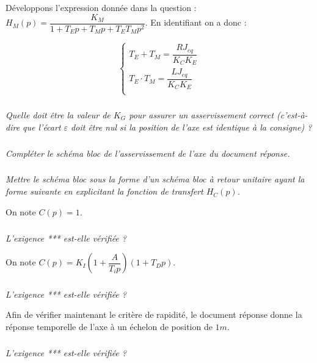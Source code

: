 \documentclass[10pt,fleqn]{article} %
\begin{document}
\begin{multicols}{2}
\begin{corrige}
Développons l'expression donnée dans la question : 
$H_M(p)=\dfrac{K_M}{1+T_Ep + T_M p + T_E T_M p^2}$. En identifiant on a donc :

$$
\left\{ 
\begin{array}{l}
T_E + T_M = \dfrac{RJ_{eq}}{K_C K_E} \\
T_E \cdot T_M = \dfrac{LJ_{eq}}{K_C K_E} \\
\end{array}
\right.
$$


\end{corrige}
\else
\fi
\subparagraph{}
\textit{Quelle doit être la valeur de $K_G$ pour assurer un asservissement correct (c'est-à-dire que l'écart $\varepsilon$ doit être nul si la position de l'axe est identique à la consigne) ?}
\ifprof
\begin{corrige}
\end{corrige}
\else
\fi
\subparagraph{}
\textit{Compléter le schéma bloc de l'asservissement de l'axe du document réponse.}
\ifprof
\begin{corrige}
\end{corrige}
\else
\fi

\subparagraph{}
\textit{Mettre le schéma bloc sous la forme d'un schéma bloc à retour unitaire ayant la forme suivante en explicitant la fonction de transfert $H_C(p)$.}
\ifprof
\begin{corrige}
\end{corrige}
\else
\fi

On note $C(p)=1$.
\subparagraph{}
\textit{L'exigence *** est-elle vérifiée ?}
\ifprof
\begin{corrige}
\end{corrige}
\else
\fi

On note $C(p)=K_I \left( 1+\dfrac{A}{T_i p} \right) \left(1+ T_D p \right)$.
\subparagraph{}
\textit{L'exigence *** est-elle vérifiée ?}
\ifprof
\begin{corrige}
\end{corrige}
\else
\fi

Afin de vérifier maintenant le critère de rapidité, le document réponse donne la réponse temporelle de
l'axe à un échelon de position de $1 m$.

\subparagraph{}
\textit{L'exigence *** est-elle vérifiée ?}
\ifprof
\begin{corrige}
\end{corrige}
\else
\fi
\end{multicols}
\end{document}
